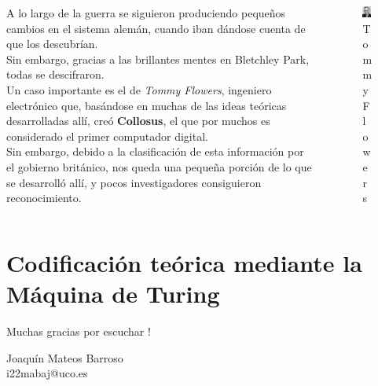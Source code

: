 \documentclass[aspectratio=169]{beamer}
\begin{document}
\begin{frame}
	
	\begin{columns}
		\begin{column}{0.6\linewidth}
			A lo largo de la guerra se siguieron produciendo pequeños cambios en el sistema alemán, cuando iban dándose cuenta de que los descubrían.\\
			Sin embargo, gracias a las brillantes mentes en Bletchley Park, todas se descifraron.\\
			Un caso importante es el de \textit{Tommy Flowers}, ingeniero electrónico que, basándose en muchas de las ideas teóricas desarrolladas allí, creó \textbf{Collosus}, el que por muchos es considerado el primer computador digital.\\
			Sin embargo, debido a la clasificación de esta información por el gobierno británico, nos queda una pequeña porción de lo que se desarrolló allí, y pocos investigadores consiguieron reconocimiento.
		\end{column}
	
		\begin{column}{0.4\linewidth}
			\begin{figure}
			\centering
			\includegraphics[width=0.7\linewidth]{"pic/Tommy Flowers"}
			\caption{Tommy Flowers}
			\end{figure}
		\end{column}
	\end{columns}
	
\end{frame}

\section{Codificación teórica mediante la Máquina de Turing}

\begin{frame}
\begin{center}
{ Muchas gracias por escuchar !}
\vspace{1cm}

Joaquín Mateos Barroso \\  [1em]
i22mabaj@uco.es 
\end{center}
\end{frame}
\end{document}
